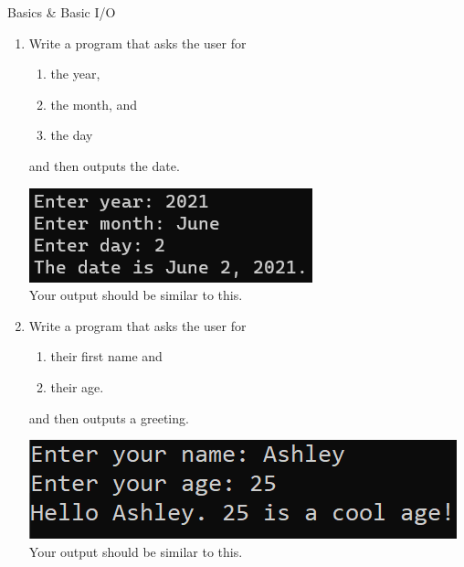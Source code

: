 \documentclass{article}
\begin{document}
\begin{flushright}
Basics \& Basic I/O \end{flushright}

\vspace*{-1.5em}
\noindent\makebox[\linewidth]{\rule{\paperwidth}{0.4pt}}


\vspace*{2em}

\begin{enumerate}


	\item Write a program that asks the user for \\
		\begin{minipage}{0.5\textwidth}	
		\vspace*{-0.5em}
			\begin{enumerate}  \setlength\itemsep{-0.3em}
				\item the year,
				\item the month, and
				\item the day	
			\end{enumerate} \vspace*{-1ex}
		and then outputs the date.
		\end{minipage}
		\begin{minipage}{0.5\textwidth}
			\centering
			\includegraphics[scale=0.75]{./imgs/dateOutput.png}\\
			Your output should be similar to this.
		\end{minipage}

	


	\item Write a program that asks the user for \\
		\begin{minipage}{0.5\textwidth}
		\vspace*{-0.5em}
			\begin{enumerate}  \setlength\itemsep{-0.3em}
				\item their first name and
				\item their age.  
			\end{enumerate} \vspace*{-1ex}
		and then outputs a greeting.
		\end{minipage}
		\begin{minipage}{0.5\textwidth}
			\centering
			\includegraphics[scale=0.95]{./imgs/outputGreetingWithAge.png}\\
			Your output should be similar to this.
		\end{minipage}





\end{enumerate}
\end{document}
